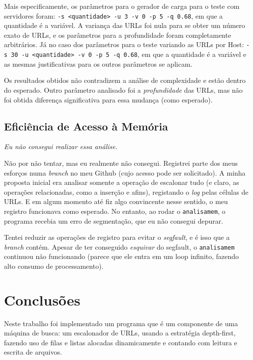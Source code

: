 \documentclass{article}
\def\code#1{\texttt{#1}}
\begin{document}
Mais especificamente, os parâmetros para o gerador de carga para o teste com servidores foram: \code{-s <quantidade> -u 3 -v 0 -p 5 -q 0.68}, em que a quantidade é a variável. A variança das URLs foi nula para se obter um número exato de URLs, e os parâmetros para a profundidade foram completamente arbitrários. Já no caso dos parâmetros para o teste variando as URLs por Host: \code{-s 30 -u <quantidade> -v 0 -p 5 -q 0.68}, em que a quantidade é a variável e as mesmas justificativas para os outros parâmetros se aplicam.

Os resultados obtidos não contradizem a análise de complexidade e estão dentro do esperado. Outro parâmetro analisado foi a \textit{profundidade} das URLs, mas não foi obtida diferença significativa para essa mudança (como esperado).

\subsection{Eficiência de Acesso à Memória}

\textit{Eu não consegui realizar essa análise.} 

Não por não tentar, mas eu realmente não consegui. Registrei parte dos meus esforços numa \textit{branch} no meu Github (cujo acesso pode ser solicitado). A minha proposta inicial era analisar somente a operação de escalonar tudo (e claro, as operações relacionadas, como a inserção e afins), registando o \textit{log} pelas células de URLs. E em algum momento até fiz algo convincente nesse sentido, o meu registro funcionava como esperado. No entanto, ao rodar o \code{analisamem}, o programa recebia um erro de segmentação, que eu não consegui depurar.

Tentei reduzir as operações de registro para evitar o \textit{segfault}, e é isso que a \textit{branch} contém. Apesar de ter conseguido \textit{esquivar} do segfault, o \code{analisamem} continuou não funcionando (parece que ele entra em um loop infinito, fazendo alto consumo de processamento).

\section{Conclusões}

Neste trabalho foi implementado um programa que é um componente de uma máquina de busca: um escalonador de URLs, usando a estratégia depth-first, fazendo uso de filas e listas alocadas dinamicamente e contando com leitura e escrita de arquivos.
\end{document}
